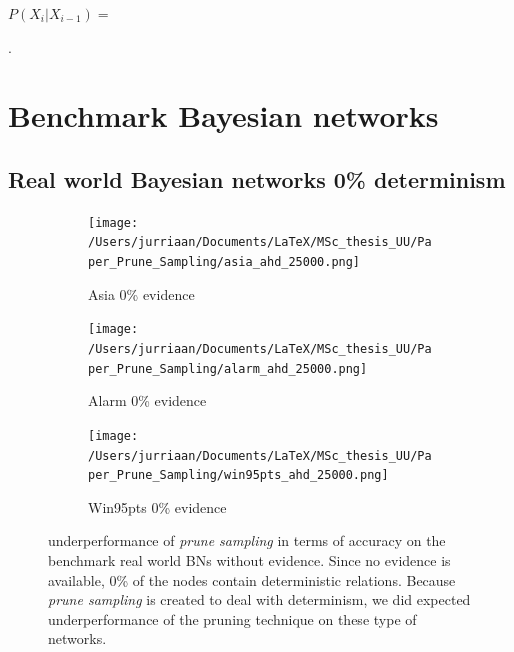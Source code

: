 \documentclass[a4paper, twoside, 11pt]{report}
\theoremstyle{plain}
\theoremstyle{definition}
\theoremstyle{remark}
\newcommand{\ps}{\textit{prune sampling }}
\begin{document}
\vspace{2pc}
$P(X_i |X_{i-1})=$
\begin{table}[h!]
\centering
{}.
\caption{a block shaped CPT}
\label{block}
\end{table}

\section{Benchmark Bayesian networks}
\subsection{Real world Bayesian networks 0\% determinism}\label{real_world_no_evidence}

\begin{figure}[H]
\centering
\begin{subfigure}{0.5\textwidth}
\texttt{[image: /Users/jurriaan/Documents/LaTeX/MSc\_thesis\_UU/Paper\_Prune\_Sampling/asia\_ahd\_25000.png]}
\caption{Asia 0\% evidence}%
\label{asia}%
\end{subfigure}\hfill%
\begin{subfigure}{0.5\textwidth}
\texttt{[image: /Users/jurriaan/Documents/LaTeX/MSc\_thesis\_UU/Paper\_Prune\_Sampling/alarm\_ahd\_25000.png]}
\caption{Alarm 0\% evidence}%
\label{alarm}%
\end{subfigure}%
\begin{subfigure}{0.5\textwidth}
\texttt{[image: /Users/jurriaan/Documents/LaTeX/MSc\_thesis\_UU/Paper\_Prune\_Sampling/win95pts\_ahd\_25000.png]}
\caption{Win95pts 0\% evidence}%
\label{win95pts}%
\end{subfigure}\hfill%
\vspace{0.75pc}
\caption{underperformance of \ps in terms of accuracy on the benchmark real world BNs without evidence. Since no evidence is available, 0\% of the nodes contain deterministic relations. Because \ps is created to deal with determinism, we did expected underperformance of the pruning technique on these type of networks.  }
\label{results2}
\end{figure}
\end{document}
